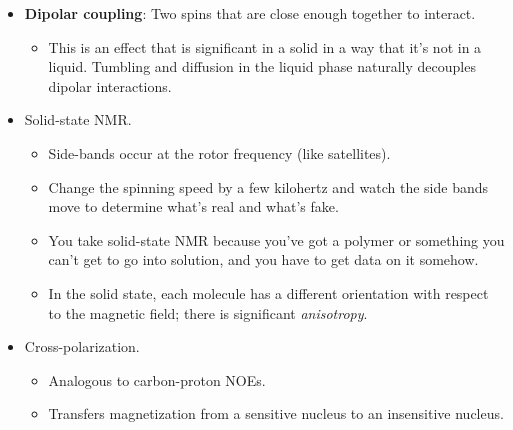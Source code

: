 \documentclass[../notes.tex]{subfiles}
\begin{document}
\begin{itemize}
    \begin{itemize}
        \item This angle solves the equation
        \begin{equation*}
            3\cos^2\theta-1 = 0
        \end{equation*}
        \item This averages out \textbf{dipolar couplings}.
        \item Smaller and smaller rotors can be spun faster and faster. When you get to spinning at \SI{32}{\kilo\hertz}, you can just take a normal proton spectrum as if you were in liquid. Requires a \SIrange{0.6}{0.7}{\milli\meter} rotor; trying to cap this is like trying to cap a grain of sand.
        \item First ultra-small rotors were developed on Albany St. by Robert Guy Griffin!
    \end{itemize}
    \item \textbf{Dipolar coupling}: Two spins that are close enough together to interact.
    \begin{itemize}
        \item This is an effect that is significant in a solid in a way that it's not in a liquid. Tumbling and diffusion in the liquid phase naturally decouples dipolar interactions.
    \end{itemize}
    \item Solid-state NMR.
    \begin{itemize}
        \item Side-bands occur at the rotor frequency (like satellites).
        \item Change the spinning speed by a few kilohertz and watch the side bands move to determine what's real and what's fake.
        \item You take solid-state NMR because you've got a polymer or something you can't get to go into solution, and you have to get data on it somehow.
        \item In the solid state, each molecule has a different orientation with respect to the magnetic field; there is significant \emph{anisotropy}.
    \end{itemize}
    \item Cross-polarization.
    \begin{itemize}
        \item Analogous to carbon-proton NOEs.
        \item Transfers magnetization from a sensitive nucleus to an insensitive nucleus.

\end{itemize}
\end{itemize}
\end{document}
